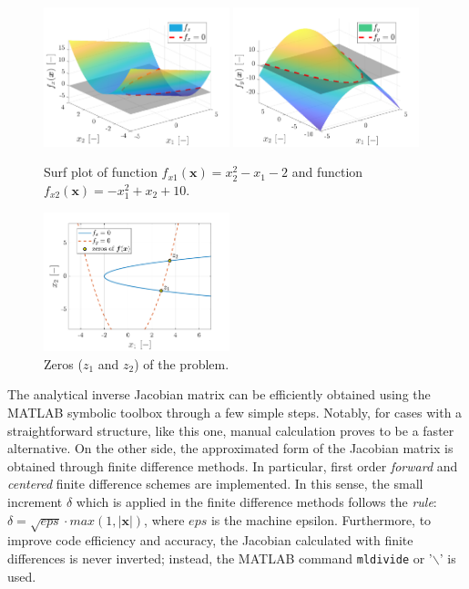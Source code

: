 \documentclass[11pt,a4paper,oneside]{article}
\renewcommand{\vec}[1]{\mathbf{#1}}
\begin{document}
\begin{figure}[h]
    \centering
    \includegraphics[width = 0.48\textwidth]{gfx/ex1_1.pdf}
    \includegraphics[width = 0.48\textwidth]{gfx/ex1_2.pdf}
    \caption{Surf plot of function $f_{x1}(\vec{x})=x_2^2-x_1-2$ and function $f_{x2}(\vec{x})=-x_1^2+x_2+10$.}\label{fig:ex1_1}
\end{figure}

\begin{figure}
    \centering
    \vspace{-0.3cm}
    
        \includegraphics[width = 0.48\textwidth]{gfx/ex1_3.pdf}
        \caption{Zeros ($z_1$ and $z_2$) of the problem.}\label{fig:ex1_2}
\end{figure}
The analytical inverse Jacobian matrix can be efficiently obtained using the MATLAB symbolic toolbox 
through a few simple steps. Notably, for cases with a straightforward structure, like this one, 
manual calculation proves to be a faster alternative.
 On the other side, the approximated form of the Jacobian matrix is obtained 
through finite difference methods. In particular, first order \textit{forward} and \textit{centered} 
finite difference schemes are implemented. In this sense, the small increment $\delta$ which is applied 
in the finite difference methods follows the \textit{rule}: 
$\delta=\sqrt{eps}\cdot max(1, |\vec{x}|)$, where $eps$ is the machine epsilon. 
Furthermore, to improve code efficiency and accuracy, the Jacobian calculated with finite differences 
is never inverted; instead, the MATLAB command \texttt{mldivide} or '$\backslash$' is used. 
\end{document}
